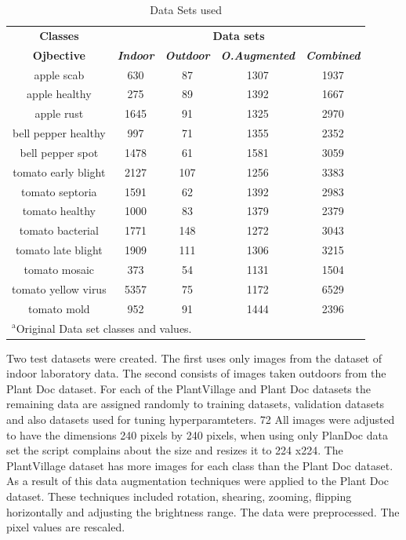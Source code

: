 \documentclass[conference]{IEEEtran}
\begin{document}
\begin{table}[htbp]
\caption{Data Sets used}
\begin{center}
\begin{tabular}{|c|c|c|c|c|}
\hline
\textbf{Classes}&\multicolumn{4}{|c|}{\textbf{Data sets}} \\
\cline{2-5} 
\textbf{Ojbective} & \textbf{\textit{Indoor}}& \textbf{\textit{Outdoor}}& \textbf{\textit{O.Augmented}} & \textbf{\textit{Combined}} \\
\hline
apple scab &630&87&1307&1937 \\
apple healthy &275&89&1392&1667\\
apple rust &1645&91&1325&2970\\
bell pepper healthy &997&71&1355&2352\\
bell pepper spot &1478&61&1581&3059\\
tomato early blight &2127&107&1256&3383\\
tomato septoria  &1591&62&1392&2983\\
tomato healthy &1000&83&1379&2379\\
tomato bacterial &1771&148&1272&3043\\
tomato late blight &1909&111&1306&3215\\
tomato mosaic  &373&54&1131&1504\\
tomato yellow virus &5357&75&1172&6529\\
tomato mold &952&91&1444&2396\\
\hline
\multicolumn{5}{l}{$^{\mathrm{a}}$Original Data set classes and values.}
\end{tabular}
\label{tab1}
\end{center}
\end{table}
Two test datasets were created. The first uses only images from the dataset of indoor laboratory data. The second consists of images taken outdoors from the Plant Doc dataset. For each of the PlantVillage and Plant Doc datasets the remaining data are assigned randomly to training datasets, validation datasets and also datasets used for tuning hyperparamteters. 72%
All images were adjusted to have the dimensions 240 pixels by 240 pixels, when using only PlanDoc data set the script complains about the size and resizes it to 224 x224. The PlantVillage dataset has more images for each class than the Plant Doc dataset. As a result of this data augmentation techniques were applied to the Plant Doc dataset. These techniques included rotation, shearing, zooming, flipping horizontally and adjusting the brightness range. The data were preprocessed. The pixel values are rescaled. 
\end{document}
